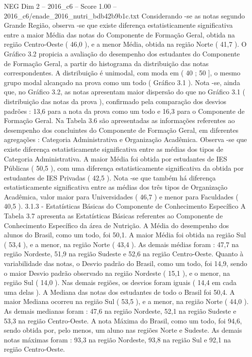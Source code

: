 \begin{textsample}{NEG Dim 2 – 2016\_c6 – Score 1.00 – 2016\_c6/enade\_2016\_nutri\_bdb42b9b1c.txt}
Considerando -se as notas segundo Grande Região, observa -se que existe diferença estatisticamente significativa entre a maior Média das notas do Componente de Formação Geral, obtida na região Centro-Oeste ( 46,0 ), e a menor Média, obtida na região Norte ( 41,7 ).
O Gráfico 3.2 propicia a avaliação do desempenho dos estudantes do Componente de Formação Geral, a partir do histograma da distribuição das notas correspondentes.
A distribuição é unimodal, com moda em ( 40 ; 50 ], o mesmo grupo modal alcançado na prova como um todo ( Gráfico 3.1 ).
Nota -se, ainda que, no Gráfico 3.2, as notas apresentam maior dispersão do que no Gráfico 3.1 ( distribuição das notas da prova ), confirmado pela comparação dos desvios padrões : 13,6 para a nota da prova como um todo e 16,3 para o Componente de Formação Geral.
Na Tabela 3.6 são apresentadas as informações referentes ao desempenho dos concluintes do Componente de Formação Geral, em diferentes agregações : Categoria Administrativa e Organização Acadêmica.
Observa -se que existe diferença estatisticamente significativa entre as médias dos tipos de Categoria Administrativa.
A maior Média foi obtida por estudantes de IES Públicas ( 50,5 ), com uma diferença estatisticamente significativa da obtida por estudantes de IES Privadas ( 42,5 ).
Nota -se que também há diferença estatisticamente significativa entre as médias dos três tipos de Organização Acadêmica, valor maior para Universidades ( 46,7 ) e menor para Faculdades ( 40,5 ). 3.1.3 - Estatísticas Básicas do Componente de Conhecimento Específico A Tabela 3.7 apresenta as Estatísticas Básicas referentes ao Componente de Conhecimento Específico da área de Nutrição.
A Média do desempenho dos alunos do Brasil, como um todo, foi 50,1.
A maior Média foi obtida na região Sul ( 53,4 ), e a menor, na região Norte ( 43,4 ).
As demais médias foram : 47,7 na região Nordeste, 51,9 na região Sudeste e 52,6 na região Centro-Oeste.
Quanto à variabilidade das notas, o Desvio padrão do Brasil, como um todo, foi 14,9, sendo o maior Desvio padrão observado na região Nordeste ( 15,1 ), e o menor, na região Sul ( 14,0 ).
Nas demais regiões, os desvios foram iguais ( 14,4 em cada uma delas ).
A Mediana das notas dos estudantes de todo o Brasil foi 50,4.
A maior Mediana ocorreu na região Sul ( 53,5 ), e a menor, na região Norte ( 44,0 ).
As demais medianas foram : 47,6 na região Nordeste, 52,1 na região Sudeste e 53,3 na região Centro-Oeste.
A nota Máxima do Brasil, como um todo, foi 94,6, sendo obtida por, pelo menos, um aluno nas regiões Norte e Sudeste.
As demais notas máximas foram : 93,3 na região Nordeste, 93,8 na região Sul e 92,1 na região Centro-Oeste.

\end{textsample}
